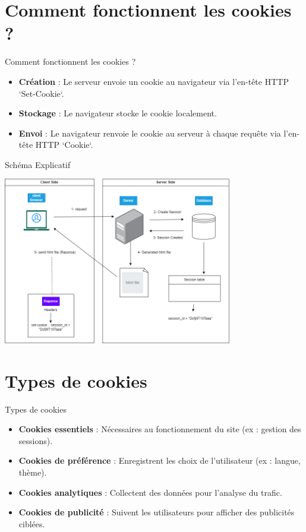 \documentclass{clbeamer2024}
\begin{document}
	\section{Comment fonctionnent les cookies ?}
	\begin{frame}{Comment fonctionnent les cookies ?}
		\begin{itemize}
			\item \textbf{Création} : Le serveur envoie un cookie au navigateur via l'en-tête HTTP `Set-Cookie`.
			\item \textbf{Stockage} : Le navigateur stocke le cookie localement.
			\item \textbf{Envoi} : Le navigateur renvoie le cookie au serveur à chaque requête via l'en-tête HTTP `Cookie`.
		\end{itemize}
	\end{frame}
	
	\begin{frame}{Schéma Explicatif }
		\begin{center}
		    \includegraphics[width=10cm]{test/schema.png} 
		\end{center}
		
		 
			
	\end{frame}
	
	\section{Types de cookies}
	\begin{frame}{Types de cookies}
		\begin{itemize}
			\item \textbf{Cookies essentiels} : Nécessaires au fonctionnement du site (ex : gestion des sessions).
			\item \textbf{Cookies de préférence} : Enregistrent les choix de l'utilisateur (ex : langue, thème).
			\item \textbf{Cookies analytiques} : Collectent des données pour l'analyse du trafic.
			\item \textbf{Cookies de publicité} : Suivent les utilisateurs pour afficher des publicités ciblées.
		\end{itemize}
	\end{frame}
\end{document}
